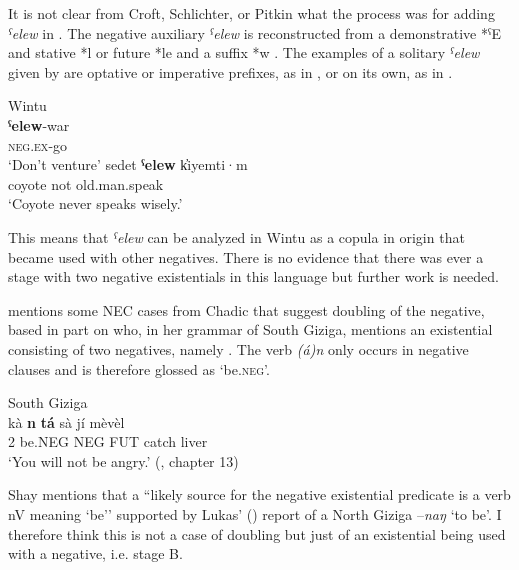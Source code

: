 ﻿\documentclass[output=paper]{langsci/langscibook}
\begin{document}
It is not clear from Croft, Schlichter, or Pitkin what the process was for
adding \textit{ˁelew} in . The negative auxiliary
\textit{ˁelew} is reconstructed from a demonstrative *ˁE and stative *l or
future *le and a suffix *w \citep[164]{Pitkin1984}. The examples of a
solitary \textit{ˁelew} given by \citet[198]{Pitkin1984} are optative or
imperative prefixes, as in , or on its own, as in
.

\begin{exe}\ex Wintu \label{ex:other-wintu-venture}\\
    \gll \textbf{ˁelew}-war \\
\textsc{neg.ex}-go \\
    \glt `Don't venture' \citep[198]{Pitkin1984}
    \ex \label{ex:other-wintu-coyote}
    \gll sedet  \textbf{ˁelew}  k̓iyemti·m \\
coyote  not  old.man.speak \\
    \glt `Coyote never speaks wisely.' \citep[269]{Pitkin1984}
    \end{exe}
%
This means that \textit{ˁelew} can be analyzed in Wintu as a
copula in origin that became used with other negatives. There is no
evidence that there was ever a stage with two negative existentials in this
language but further work is needed.

\textcite{Butters2019} mentions some NEC cases from Chadic that suggest
doubling of the negative, based in part on \citet{Shay2008} who, in her
grammar of South Giziga, mentions an existential consisting of two
negatives, namely . The verb \textit{(á)n} only occurs in
negative clauses and is therefore glossed as `be.\textsc{neg}'.
%
\begin{exe}\ex South Giziga \label{ex:other-giziga-angry}\\
    \gll kà  \textbf{n}  \textbf{tá}  sà  jí  mèvèl      \\
2  be.\textsc{NEG}  \textsc{NEG}  \textsc{FUT}  catch  liver \\
    \glt
‘You will not be angry.' (\citealt{Shay2008}, chapter 13)
    \end{exe}
%
Shay mentions that a ``likely source for the negative existential predicate
is a verb nV meaning `be'' supported by Lukas' (\citeyear[151]{Lukas1970}) report of a
North Giziga –\textit{naŋ} `to be'. I therefore think this is not a case of
doubling but just of an existential being used with a negative, i.e. stage
B.
\end{document}
